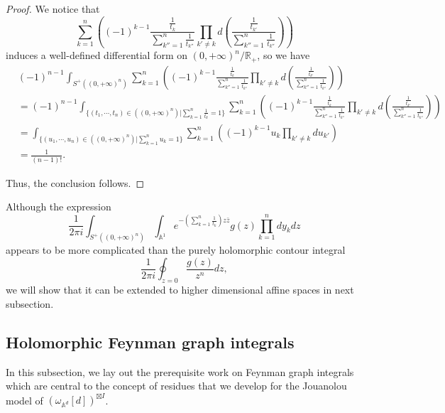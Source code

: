 \documentclass[11pt]{amsart}
\theoremstyle{definition}
\theoremstyle{remark}
\numberwithin{equation}{section}
\begin{document}
\begin{proof}
We notice that
$$
\sum_{k=1}^{n}\left((-1)^{k-1}\frac{\frac{1}{t_{k}}}{\sum_{k''=1}^{n}\frac{1}{t_{k''}}}\prod_{k'\neq k}d(\frac{\frac{1}{t_{k'}}}{\sum_{k''=1}^{n}\frac{1}{t_{k''}}})\right)
$$
induces a well-defined differential form on $(0,+\infty)^{n}/\mathbb{R}_+$, so we have
\begin{align*}
&(-1)^{n-1}\int_{S^{+}((0,+\infty)^n)}\sum_{k=1}^{n}\left((-1)^{k-1}\frac{\frac{1}{t_{k}}}{\sum_{k''=1}^{n}\frac{1}{t_{k''}}}\prod_{k'\neq k}d(\frac{\frac{1}{t_{k'}}}{\sum_{k''=1}^{n}\frac{1}{t_{k''}}})\right)\\
&=
(-1)^{n-1}\int_{\{(t_{1},\cdots,t_{n})\in((0,+\infty)^n)|\sum_{k=1}^{n}\frac{1}{t_{k}}=1\}}\sum_{k=1}^{n}\left((-1)^{k-1}\frac{\frac{1}{t_{k}}}{\sum_{k''=1}^{n}\frac{1}{t_{k''}}}\prod_{k'\neq k}d(\frac{\frac{1}{t_{k'}}}{\sum_{k''=1}^{n}\frac{1}{t_{k''}}})\right)\\
&=
\int_{\{(u_{1},\cdots,u_{n})\in((0,+\infty)^n)|\sum_{k=1}^{n}u_{k}=1\}}\sum_{k=1}^{n}\left((-1)^{k-1}u_{k}\prod_{k'\neq k}du_{k'}\right)\\
&=\frac{1}{(n-1)!}.
\end{align*}

Thus, the conclusion follows.
\end{proof}

Although the expression
$$
\frac{1}{2\pi i}\int_{S^{+}((0,+\infty)^n)}\int_{\mathbb{A}^{1}}e^{-\left(\sum_{k=1}^{n}\frac{1}{t_{k}}\right)z\bar{z}}g(z)\prod_{k=1}^{n}dy_{k}dz
$$
appears to be more complicated than the purely holomorphic contour integral
$$
\frac{1}{2\pi i}\oint_{z=0}\frac{g(z)}{z^{n}}dz,
$$
we will show that it can be extended to higher dimensional affine spaces in next subsection.

\subsection{Holomorphic Feynman graph integrals}

In this subsection, we lay out the prerequisite work on Feynman graph integrals which are central to the concept of
residues that we develop for the Jouanolou model of $(\omega_{\mathbb{A}^{d}}[d])^{\boxtimes  I}$.
\end{document}
